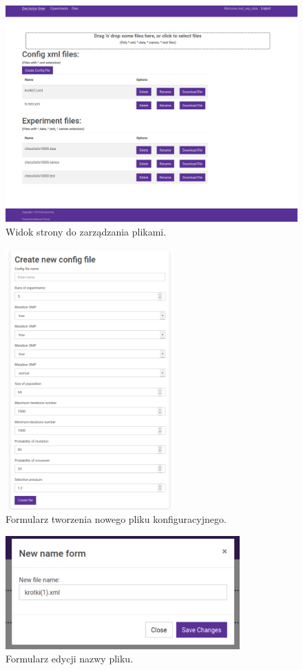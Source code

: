 \begin{figure}[htb]
	\centering
	\includegraphics[width=15cm]{grafika/file_page.eps}
	\caption{Widok strony do zarządzania plikami.}
	\label{rys17_file_page}
\end{figure}

\begin{figure}[htb]
	\centering
	\includegraphics[height=10cm]{grafika/config_form.eps}
	\caption{Formularz tworzenia nowego pliku konfiguracyjnego.}
	\label{rys18_config_form}
\end{figure}

\begin{figure}[htb]
	\centering
	\includegraphics[width=9cm]{grafika/edit_name.eps}
	\caption{Formularz edycji nazwy pliku.}
	\label{rys19_edit_name}
\end{figure}

